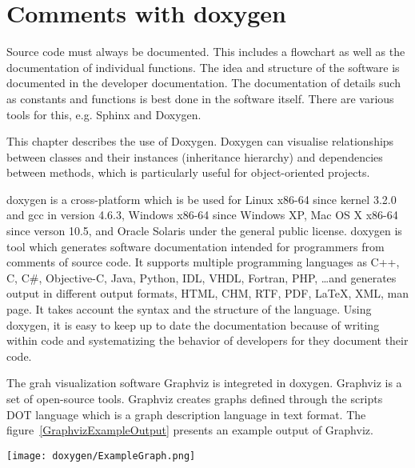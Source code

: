 %
%


\chapter{Comments with doxygen}

Source code must always be documented. This includes a flowchart as well as the documentation of individual functions. The idea and structure of the software is documented in the developer documentation. The documentation of details such as constants and functions is best done in the software itself. There are various tools for this, e.g. Sphinx and Doxygen. \cite{VanHeesch:2024,Beningo:2017,Sphinx:2024,Ousterhout:2018} 

This chapter describes the use of Doxygen. Doxygen can visualise relationships between classes and their instances (inheritance hierarchy) and dependencies between methods, which is particularly useful for object-oriented projects.


doxygen is a cross-platform which is be used for Linux x86-64 since kernel 3.2.0 and gcc in version 4.6.3,  Windows x86-64 since Windows XP, Mac OS X x86-64 since verson 10.5, and Oracle Solaris under the general public license. doxygen is tool which generates software documentation intended for programmers  from comments of source code. It supports multiple programming languages as C++, C, C\#, Objective-C, Java, Python, IDL, VHDL, Fortran, PHP, \ldots and generates output in different output formats, HTML, CHM, RTF, PDF, LaTeX, XML, man page. It takes account the syntax and the structure of the language. Using doxygen, it is easy to keep up to date the documentation because of writing within code and systematizing the behavior of developers for they document their code.

The grah visualization software Graphviz is integreted in doxygen. Graphviz is a set of open-source tools.
Graphviz  creates graphs defined through the scripts DOT language which is a graph description language in text format. The figure~\ref{GraphvizExampleOutput} presents an example output of Graphviz.
	

\begin{center}	
	\texttt{[image: doxygen/ExampleGraph.png]}
	\label{GraphvizExampleOutput}
\end{center}	
	


